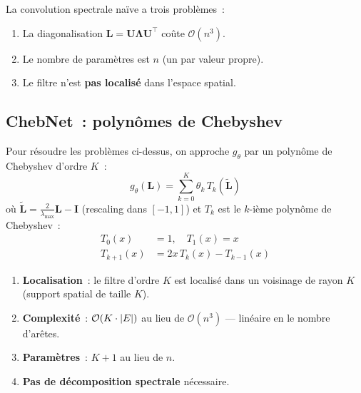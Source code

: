 \begin{attention}[title=\textbf{Co\^ut computationnel}]
La convolution spectrale na\"ive a trois probl\`emes~:
\begin{enumerate}
    \item La diagonalisation $\mathbf{L} = \mathbf{U}\boldsymbol{\Lambda}\mathbf{U}^\top$
          co\^ute $\mathcal{O}(n^3)$.
    \item Le nombre de param\`etres est $n$ (un par valeur propre).
    \item Le filtre n'est \textbf{pas localis\'e} dans l'espace spatial.
\end{enumerate}
\end{attention}

\subsection{ChebNet~: polyn\^omes de Chebyshev}

\begin{definition}
Pour r\'esoudre les probl\`emes ci-dessus, on approche $g_\theta$ par un
polyn\^ome de Chebyshev d'ordre $K$~:
\[
    g_\theta(\mathbf{L}) = \sum_{k=0}^{K} \theta_k\, T_k(\tilde{\mathbf{L}})
\]
o\`u $\tilde{\mathbf{L}} = \frac{2}{\lambda_{\max}}\mathbf{L} - \mathbf{I}$
(rescaling dans $[-1, 1]$) et $T_k$ est le $k$-i\`eme polyn\^ome de Chebyshev~:
\begin{align}
    T_0(x) &= 1, \quad T_1(x) = x \\
    T_{k+1}(x) &= 2x\, T_k(x) - T_{k-1}(x)
\end{align}
\end{definition}

\begin{theoreme}
\begin{enumerate}
    \item \textbf{Localisation}~: le filtre d'ordre $K$ est localis\'e dans
          un voisinage de rayon $K$ (support spatial de taille $K$).
    \item \textbf{Complexit\'e}~: $\mathcal{O}(K \cdot \left| E \right|)$ au lieu de
          $\mathcal{O}(n^3)$ --- lin\'eaire en le nombre d'ar\^etes.
    \item \textbf{Param\`etres}~: $K + 1$ au lieu de $n$.
    \item \textbf{Pas de d\'ecomposition spectrale} n\'ecessaire.
\end{enumerate}
\end{theoreme}


